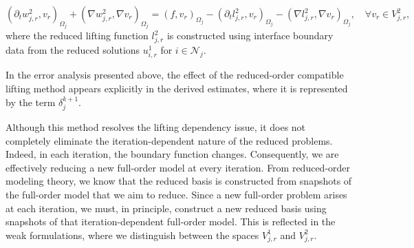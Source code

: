 \documentclass[a4paper, 11pt]{article}
\theoremstyle{remark}
\begin{document}
\begin{equation*}
    \left(\partial_{t} w_{j, r}^{2}, v_{r}\right)_{\Omega_{j}} + \left(\nabla w_{j, r}^{2}, \nabla v_{r}\right)_{\Omega_{j}} = \left(f, v_{r}\right)_{\Omega_{j}} - \left(\partial_{t} l_{j, r}^{2}, v_{r}\right)_{\Omega_{j}} - \left(\nabla l_{j, r}^{2}, \nabla v_{r}\right)_{\Omega_{j}}, \quad\forall v_{r}\in V^{2}_{j, r},
\end{equation*}
where the reduced lifting function $l_{j, r}^{2}$ is constructed using interface boundary data from the reduced solutions $u_{i, r}^{1}$ for $i\in \mathcal{N}_{j}$. 

\vspace{10pt}
\noindent In the error analysis presented above, the effect of the reduced-order compatible lifting method appears explicitly in the derived estimates, where it is represented by the term $\delta_{j}^{k+1}$. 

\vspace{10pt}
\noindent Although this method resolves the lifting dependency issue, it does not completely eliminate the iteration-dependent nature of the reduced problems. Indeed, in each iteration, the boundary function changes. Consequently, we are effectively reducing a new full-order model at every iteration. From reduced-order modeling theory, we know that the reduced basis is constructed from snapshots of the full-order model that we aim to reduce. Since a new full-order problem arises at each iteration, we must, in principle, construct a new reduced basis using snapshots of that iteration-dependent full-order model. This is reflected in the weak formulations, where we distinguish between the spaces $V_{j,r}^{1}$ and $V_{j,r}^{2}$.
\end{document}
